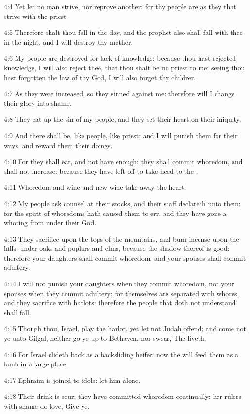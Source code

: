 4:4 Yet let no man strive, nor reprove another: for thy people are as
they that strive with the priest.

4:5 Therefore shalt thou fall in the day, and the prophet also shall
fall with thee in the night, and I will destroy thy mother.

4:6 My people are destroyed for lack of knowledge: because thou hast
rejected knowledge, I will also reject thee, that thou shalt be no
priest to me: seeing thou hast forgotten the law of thy God, I will
also forget thy children.

4:7 As they were increased, so they sinned against me: therefore will
I change their glory into shame.

4:8 They eat up the sin of my people, and they set their heart on
their iniquity.

4:9 And there shall be, like people, like priest: and I will punish
them for their ways, and reward them their doings.

4:10 For they shall eat, and not have enough: they shall commit
whoredom, and shall not increase: because they have left off to take
heed to the \LORD.

4:11 Whoredom and wine and new wine take away the heart.

4:12 My people ask counsel at their stocks, and their staff declareth
unto them: for the spirit of whoredoms hath caused them to err, and
they have gone a whoring from under their God.

4:13 They sacrifice upon the tops of the mountains, and burn incense
upon the hills, under oaks and poplars and elms, because the shadow
thereof is good: therefore your daughters shall commit whoredom, and
your spouses shall commit adultery.

4:14 I will not punish your daughters when they commit whoredom, nor
your spouses when they commit adultery: for themselves are separated
with whores, and they sacrifice with harlots: therefore the people
that doth not understand shall fall.

4:15 Though thou, Israel, play the harlot, yet let not Judah offend;
and come not ye unto Gilgal, neither go ye up to Bethaven, nor swear,
The \LORD liveth.

4:16 For Israel slideth back as a backsliding heifer: now the \LORD
will feed them as a lamb in a large place.

4:17 Ephraim is joined to idols: let him alone.

4:18 Their drink is sour: they have committed whoredom continually:
her rulers with shame do love, Give ye.

